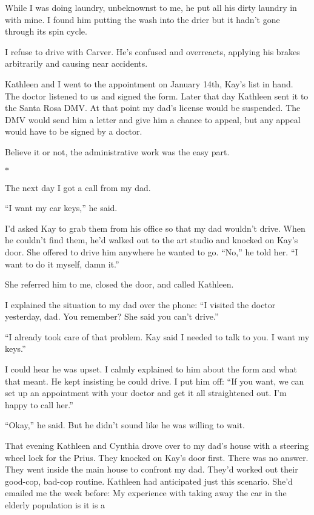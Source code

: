 \documentclass[12pt]{book}
\begin{document}
While I was doing laundry, unbeknownst to me, he put all his dirty laundry in with mine. I found him putting the wash into the drier but it hadn't gone through its spin cycle.

I refuse to drive with Carver. He's confused and overreacts, applying his brakes arbitrarily and causing near accidents.

Kathleen and I went to the appointment on January 14th, Kay's list in hand. The doctor listened to us and signed the form. Later that day Kathleen sent it to the Santa Rosa DMV. At that point my dad's license would be suspended. The DMV would send him a letter and give him a chance to appeal, but any appeal would have to be signed by a doctor.

Believe it or not, the administrative work was the easy part.

\begin{center}$*$\end{center}

The next day I got a call from my dad.

``I want my car keys,'' he said.

I'd asked Kay to grab them from his office so that my dad wouldn't drive. When he couldn't find them, he'd walked out to the art studio and knocked on Kay's door. She offered to drive him anywhere he wanted to go. ``No,'' he told her. ``I want to do it myself, damn it.''

She referred him to me, closed the door, and called Kathleen.

I explained the situation to my dad over the phone: ``I visited the doctor yesterday, dad. You remember? She said you can't drive.''

``I already took care of that problem. Kay said I needed to talk to you. I want my keys.''

I could hear he was upset. I calmly explained to him about the form and what that meant. He kept insisting he could drive. I put him off: ``If you want, we can set up an appointment with your doctor and get it all straightened out. I'm happy to call her.''

``Okay,'' he said. But he didn't sound like he was willing to wait.

That evening Kathleen and Cynthia drove over to my dad's house with a steering wheel lock for the Prius. They knocked on Kay's door first. There was no answer. They went inside the main house to confront my dad. They'd worked out their good-cop, bad-cop routine. Kathleen had anticipated just this scenario. She'd emailed me the week before: My experience with taking away the car in the elderly population is it is a
\end{document}
